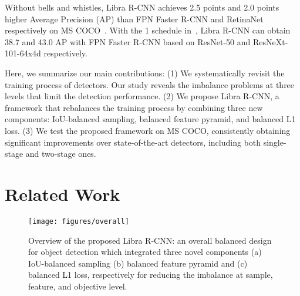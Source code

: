 \documentclass[10pt,twocolumn,letterpaper]{article}
\begin{document}
Without bells and whistles, Libra R-CNN
achieves 2.5 points and 2.0 points higher Average Precision (AP) than FPN Faster R-CNN and
RetinaNet respectively on MS COCO~\cite{coco}.
With the 1 schedule in~\cite{Detectron2018},
Libra R-CNN can obtain 38.7 and 43.0 AP with FPN Faster R-CNN based on ResNet-50
and ResNeXt-101-64x4d respectively.

Here, we summarize our main contributions:
(1) We systematically revisit the training process of detectors.
Our study reveals the imbalance problems at three levels that limit the
detection performance.
(2) We propose Libra R-CNN, a framework that rebalances the training
process by combining three new components: IoU-balanced sampling,
balanced feature pyramid, and balanced L1 loss.
(3) We test the proposed framework on MS COCO, consistently obtaining
significant improvements over state-of-the-art detectors, including
both single-stage and two-stage ones.
 

\section{Related Work}

\begin{figure*}
	\centering
	\texttt{[image: figures/overall]}
	\caption{Overview of the proposed Libra R-CNN:
		an overall balanced design for object detection which integrated three novel components (a) IoU-balanced sampling (b) balanced feature pyramid and (c) balanced L1 loss, respectively for reducing the imbalance at sample, feature, and objective level.}
	\label{fig:overall}
\end{figure*}

\vspace{0pt}
\end{document}
